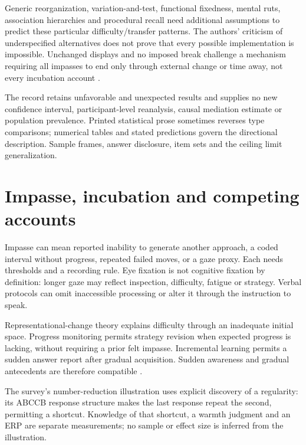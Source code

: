 Generic reorganization, variation-and-test, functional fixedness, mental ruts,
association hierarchies and procedural recall need additional assumptions
to predict these particular difficulty/transfer patterns.
The authors' criticism of underspecified alternatives does not prove that
every possible implementation is impossible. Unchanged displays and no
imposed break challenge a mechanism requiring all impasses to end only
through external change or time away, not every incubation account
\parencite[pp.~1550--1554]{KnoblichEtAl1999ConstraintsChunks}.

The record retains unfavorable and unexpected results and supplies no
new confidence interval, participant-level reanalysis, causal mediation
estimate or population prevalence. Printed statistical prose sometimes
reverses type comparisons; numerical tables and stated predictions govern
the directional description. Sample frames, answer disclosure, item sets
and the ceiling limit generalization.

\section{Impasse, incubation and competing accounts}
\label{sec:p19-insight-impasse-incubation}

Impasse can mean reported inability to generate another approach, a coded
interval without progress, repeated failed moves, or a gaze proxy.
Each needs thresholds and a recording rule. Eye fixation is not cognitive
fixation by definition: longer gaze may reflect inspection, difficulty,
fatigue or strategy. Verbal protocols can omit inaccessible processing or
alter it through the instruction to speak.

Representational-change theory explains difficulty through an inadequate
initial space. Progress monitoring permits strategy revision when expected
progress is lacking, without requiring a prior felt impasse.
Incremental learning permits a sudden answer report after gradual acquisition.
Sudden awareness and gradual antecedents are therefore compatible
\parencite[pp.~481--483,487]{VanSteenburghEtAl2012InsightRevises}.

The survey's number-reduction illustration uses explicit discovery of a
regularity: its ABCCB response structure makes the last response repeat the
second, permitting a shortcut. Knowledge of that shortcut, a warmth judgment
and an ERP are separate measurements; no sample or effect size is inferred
from the illustration.

